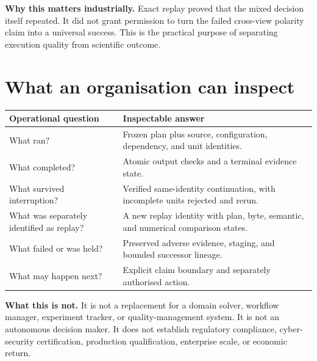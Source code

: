 \documentclass[9pt,a4paper]{article}
\begin{document}
\textbf{Why this matters industrially.} Exact replay proved that the mixed decision itself repeated. It did not grant permission to turn the failed cross-view polarity claim into a universal success. This is the practical purpose of separating execution quality from scientific outcome.

\section{What an organisation can inspect}
\begin{tabularx}{\textwidth}{p{}Y}
\toprule Operational question & Inspectable answer\\\midrule
What ran? & Frozen plan plus source, configuration, dependency, and unit identities.\\
What completed? & Atomic output checks and a terminal evidence state.\\
What survived interruption? & Verified same-identity continuation, with incomplete units rejected and rerun.\\
What was separately identified as replay? & A new replay identity with plan, byte, semantic, and numerical comparison states.\\
What failed or was held? & Preserved adverse evidence, staging, and bounded successor lineage.\\
What may happen next? & Explicit claim boundary and separately authorised action.\\
\bottomrule
\end{tabularx}

\textbf{What this is not.} It is not a replacement for a domain solver, workflow manager, experiment tracker, or quality-management system. It is not an autonomous decision maker. It does not establish regulatory compliance, cyber-security certification, production qualification, enterprise scale, or economic return.
\end{document}
